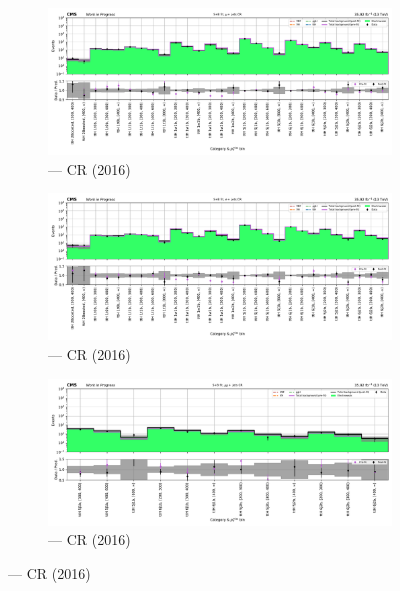 \begin{figure}[htbp]
    \centering
    \begin{subfigure}[b]{0.65\textwidth}
        \includegraphics[width=\textwidth]{chapters/higgstoinv/figures/mountain_ranges/2016/ttH/Wmunu_tree_fit_s-abs_values_ttH_cats.pdf}
        \caption{\ttH --- \singleMuCr \gls{CR} (2016)}
    \end{subfigure}

    \begin{subfigure}[b]{0.65\textwidth}
        \includegraphics[width=\textwidth]{chapters/higgstoinv/figures/mountain_ranges/2016/ttH/Wenu_tree_fit_s-abs_values_ttH_cats.pdf}
        \caption{\ttH --- \singleEleCr \gls{CR} (2016)}
    \end{subfigure}

    \begin{subfigure}[b]{0.65\textwidth}
        \includegraphics[width=\textwidth]{chapters/higgstoinv/figures/mountain_ranges/2016/ttH/Zmumu_tree_fit_s-abs_values_ttH_cats.pdf}
        \caption{\ttH --- \doubleMuCr \gls{CR} (2016)}
    \end{subfigure}


\end{figure}
